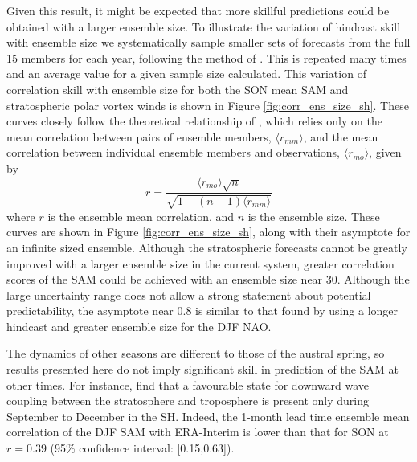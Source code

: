 Given this result, it might be expected that more skillful predictions could be
obtained with a larger ensemble size. To illustrate the variation of hindcast
skill with ensemble size we systematically sample smaller sets of forecasts from
the full 15 members for each year, following the method of
\citet{Scaife2013}. This is repeated many times and an average value for a given
sample size calculated. This variation of correlation skill with ensemble size
for both the SON mean SAM and stratospheric polar vortex winds is shown in
Figure \ref{fig:corr_ens_size_sh}. These curves closely follow the theoretical
relationship of \citet{Murphy1990}, which relies only on the mean correlation
between pairs of ensemble members, $\langle r_{mm} \rangle$, and the mean
correlation between individual ensemble members and observations,
$\langle r_{mo} \rangle$, given by
\begin{equation}
r = \frac{\langle r_{mo} \rangle \sqrt{n}}{\sqrt{1+(n-1)\langle r_{mm} \rangle}}
\end{equation} 
where $r$ is the ensemble mean correlation, and $n$ is the ensemble size. These
curves are shown in Figure \ref{fig:corr_ens_size_sh}, along with their
asymptote for an infinite sized ensemble. Although the stratospheric forecasts
cannot be greatly improved with a larger ensemble size in the current system,
greater correlation scores of the SAM could be achieved with an ensemble size
near 30. Although the large uncertainty range does not allow a strong statement
about potential predictability, the asymptote near 0.8 is similar to that found
by \citet{Scaife2013} using a longer hindcast and greater ensemble size for the
DJF NAO.

The dynamics of other seasons are different to those of the austral spring, so
results presented here do not imply significant skill in prediction of the SAM
at other times. For instance, \citet{Shaw2010} find that a favourable state for
downward wave coupling between the stratosphere and troposphere is present only
during September to December in the SH. Indeed, the 1-month lead time ensemble
mean correlation of the DJF SAM with ERA-Interim is lower than that for SON at
$r=0.39$ (95\% confidence interval: [0.15,0.63]).

